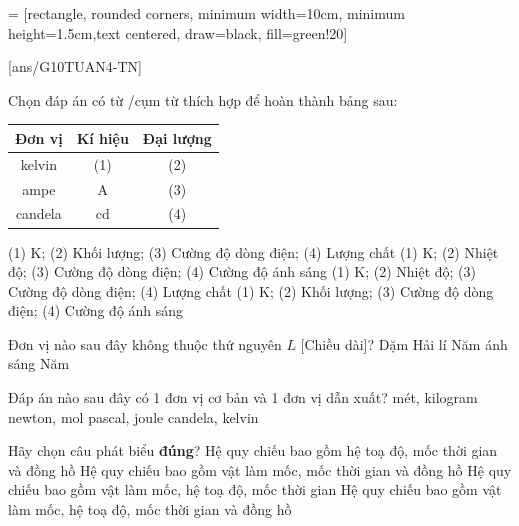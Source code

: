  = [rectangle, rounded corners, minimum width=10cm, minimum height=1.5cm,text centered, draw=black, fill=green!20]
\begin{center}
\end{center}
\setcounter{section}{0}
[ans/G10TUAN4-TN]
\begin{ex}
	Chọn đáp án có từ /cụm từ thích hợp để hoàn thành bảng sau:
	\begin{center}
		\begin{tabular}{|c|c|c|}
			\hline
			\bfseries Đơn vị &\bfseries Kí hiệu & \bfseries Đại lượng\\
			\hline
			kelvin & (1) & (2)\\
			\hline
			ampe & $\si{\ampere}$ & (3)\\
			\hline
			candela & $\si{\candela}$ & (4)\\
			\hline
		\end{tabular}
	\end{center}
	\choice
	{(1) $\si{\kelvin}$; (2) Khối lượng; (3) Cường độ dòng điện; (4) Lượng chất}
	{\True (1) $\si{\kelvin}$; (2) Nhiệt độ; (3) Cường độ dòng điện; (4) Cường độ ánh sáng}
	{(1) $\si{\kelvin}$; (2) Nhiệt độ; (3) Cường độ dòng điện; (4) Lượng chất}
	{(1) $\si{\kelvin}$; (2) Khối lượng; (3) Cường độ dòng điện; (4) Cường độ ánh sáng}
	\loigiai{}
\end{ex}
\begin{ex}
	Đơn vị nào sau đây không thuộc thứ nguyên $L$ [Chiều dài]?
	\choice
	{Dặm}
	{Hải lí}
	{Năm ánh sáng}
	{\True Năm}
	\loigiai{}
\end{ex}
\begin{ex}
Đáp án nào sau đây có 1 đơn vị cơ bản và 1 đơn vị dẫn xuất?	
	\choice
	{mét, kilogram}
	{\True newton, mol}
	{pascal, joule}
	{candela, kelvin}
	\loigiai{}
\end{ex}
\begin{ex}
	Hãy chọn câu phát biểu \textbf{đúng}?
	\choice
	{Hệ quy chiếu bao gồm hệ toạ độ, mốc thời gian và đồng hồ}
	{Hệ quy chiếu bao gồm vật làm mốc, mốc thời gian và đồng hồ}
	{Hệ quy chiếu bao gồm vật làm mốc, hệ toạ độ, mốc thời gian}
	{\True Hệ quy chiếu bao gồm vật làm mốc, hệ toạ độ, mốc thời gian và đồng hồ}
	\loigiai{}
\end{ex}
